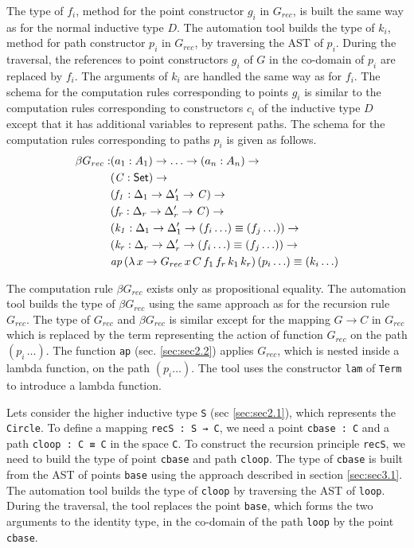 \documentclass[sigplan,10pt]{acmart}
\begin{document}
The type of $f_i$, method for the point constructor $g_i$ in $G_{rec}$, is built the same way as for the normal inductive type $D$. The automation tool builds the type of $k_i$, method for path constructor $p_i$ in $G_{rec}$, by traversing the AST of $p_i$. During the traversal, the references to point constructors $g_i$ of $G$ in the co-domain of $p_i$ are replaced by $f_i$. The arguments of $k_i$ are handled the same way as for $f_i$. The schema for the computation rules corresponding to points $g_i$ is similar to the computation rules corresponding to constructors $c_i$ of the inductive type $D$ except that it has additional variables to represent paths. The schema for the computation rules corresponding to paths $p_i$ is given as follows.
\begin{align*}
\beta G_{rec} :  & (a_1 : A_1) \to \ldots \to (a_n : A_n) \to\\
& (\mathit{C} : \textsf{Set}{}) \to \\
& (\mathit{f_1} : \Delta_1 \to  \Delta_1^\prime \to \mathit{C}) \to \\
& (\mathit{f_r} : \Delta_r \to  \Delta_r^\prime \to \mathit{C}) \to \\
& (\mathit{k_1} : \Delta_1 \to  \Delta_1^\prime \to (f_i \ldots) \equiv (f_j \ldots)) \to \\
& (\mathit{k_r} : \Delta_r \to  \Delta_r^\prime \to (f_i \ldots) \equiv (f_j \ldots)) \to \\
& \mathit{ap} \, (\lambda \, x \to G_{rec} \, x \, C \, f_1 \, f_r \, k_1 \, k_r) \, (p_i \ldots) \equiv (k_i \ldots)
\end{align*}

The computation rule $\beta G_{rec}$ exists only as propositional equality. The automation tool builds the type of $\beta G_{rec}$ using the same approach as for the recursion rule $G_{rec}$. The type of $G_{rec}$ and $\beta G_{rec}$ is similar except for the mapping $G \to C$ in $G_{rec}$ which is replaced by the term representing the action of function $G_{rec}$ on the path $(p_i \, \ldots)$. The function {\tt ap} (sec. \ref{sec:sec2.2}) applies $G_{rec}$, which is nested inside a lambda function, on the path $(p_i \ldots)$. The tool uses the constructor {\tt lam} of {\tt Term} to introduce a lambda function.

Lets consider the higher inductive type {\tt S} (sec \ref{sec:sec2.1}), which represents the {\tt Circle}. To define a mapping {\tt recS : S → C}, we need a point {\tt cbase : C} and a path {\tt cloop : C ≡ C} in the space {\tt C}. To construct the recursion principle {\tt recS}, we need to build the type of point {\tt cbase} and path {\tt cloop}. The type of {\tt cbase} is built from the AST of points {\tt base} using the approach described in section \eqref{sec:sec3.1}. The automation tool builds the type of {\tt cloop} by traversing the AST of {\tt loop}. During the traversal, the tool replaces the point {\tt base}, which forms the two arguments to the identity type, in the co-domain of the path {\tt loop} by the point {\tt cbase}.
\end{document}
